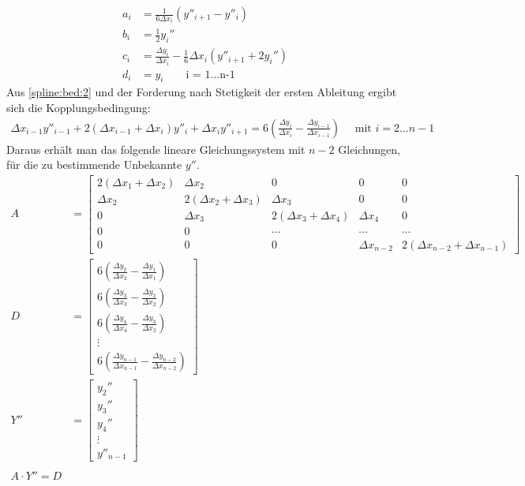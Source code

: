 \begin{align}
	a_i &= \frac{1}{6 \Delta x_i} (y''_{i+1} - y''_i)\\
	b_i &= \frac{1}{2} y_i''\\
	c_i &= \frac{\Delta y_i}{\Delta x_i} - \frac{1}{6} \Delta x_i (y''_{i+1} + 2 y_i'')\\
	d_i &= y_i \quad \quad \text{i = 1...n-1}
\end{align}\label{spline:konstant}Aus \ref{spline:bed:2} und der Forderung nach Stetigkeit der ersten Ableitung ergibt sich die Kopplungsbedingung:
\begin{align}
	\Delta x_{i-1} y''_{i-1} + 2(\Delta x_{i-1} + \Delta x_{i}) y''_i  + \Delta x_i y''_{i+1} = 6 \left(
	\frac{\Delta y_i}{\Delta x_i} - \frac{\Delta y_{i-1}}{\Delta x_{i-1}} \right) \quad \text{ mit } i = 2...n-1
\end{align}
Daraus erhält man das folgende lineare Gleichungssystem mit $n-2$ Gleichungen, für die zu bestimmende Unbekannte $y''$.
\small \begin{align}A&= \left[\begin{array}{ccccc}
2(\Delta x_1 + \Delta x_2) & \Delta x_2 & 0 & 0 & 0 \\ 
\Delta x_2 & 2(\Delta x_2 + \Delta x_3) & \Delta x_3 & 0 & 0 \\ 
0 & \Delta x_3 & 2(\Delta x_3 + \Delta x_4) & \Delta  x_4 & 0 \\ 
0 & 0 & \cdots & \cdots & \cdots \\ 
0 & 0 & 0 & \Delta x_{n-2} & 2(\Delta x_{n-2} + \Delta x_{n-1})
\end{array} \right]\\
D&= \left[
\begin{array}{c}
6\left(\frac{\Delta y_2}{\Delta x_2} - \frac{\Delta y_1}{\Delta x_1}\right) \\ 
6\left(\frac{\Delta y_3}{\Delta x_3} - \frac{\Delta y_2}{\Delta x_2}\right) \\ 
6\left(\frac{\Delta y_4}{\Delta x_4} - \frac{\Delta y_3}{\Delta x_2}\right) \\ 
\vdots\\
6\left(\frac{\Delta y_{n-1}}{\Delta x_{n-1}} - \frac{\Delta y_{n-2}}{\Delta x_{n-2}}\right)
\end{array}\right]\\
Y''&=\left[\begin{array}{c}
y_2'' \\ 
y_3'' \\ 
y_4'' \\ 
\vdots \\ 
y''_{n-1}
\end{array} \right] \\\\
A \cdot Y'' = D \label{spline:gl}
\end{align}\normalsize
